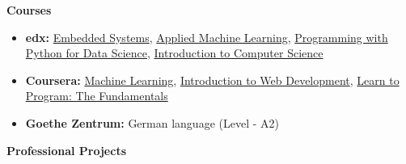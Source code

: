 \documentclass[letterpaper,11pt]{article}
\newcommand{\resheading}[1]{{\large \colorbox{mygrey}{\begin{minipage}{\textwidth}{\textbf{#1 \vphantom{p\^{E}}}}\end{minipage}}}}
\begin{document}
\resheading{Courses}
    \begin{itemize}
        \item \textbf{edx:}
        \href{https://www.edx.org/course/embedded-systems-shape-world-utaustinx-ut-6-03x} {Embedded Systems},
        \href{https://courses.edx.org/courses/course-v1:Microsoft+DAT203.3x+5T2016/info}{Applied Machine Learning},
        \href{https://courses.edx.org/courses/course-v1:Microsoft+DAT210x+6T2016/info}{Programming with Python for Data Science},
        \href{https://www.edx.org/course/introduction-computer-science-harvardx-cs50x}{Introduction to Computer Science}
        \item \textbf{Coursera:}                            \href{https://www.coursera.org/learn/machine-learning}{Machine Learning},
        \href{https://www.coursera.org/learn/web-development/home/welcome}{Introduction to Web Development},
        \href{https://www.coursera.org/learn/learn-to-program}{Learn to Program: The Fundamentals}
        \item \textbf{Goethe Zentrum:} German language (Level - A2)
    \end{itemize}
\resheading{Professional Projects}
\end{document}
